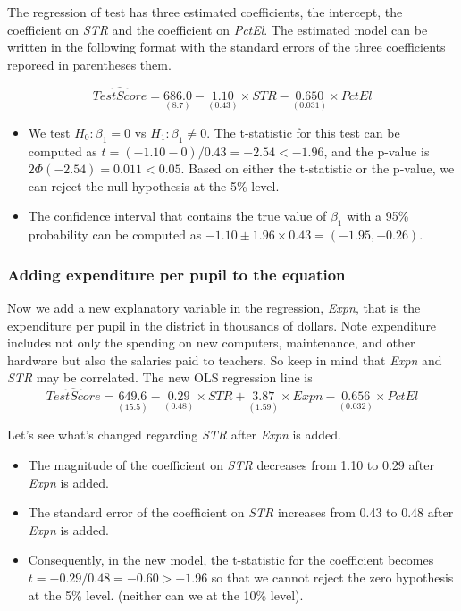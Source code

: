 \documentclass[a4paper,11pt]{article}
\begin{document}
The regression of test has three estimated coefficients, the
intercept, the coefficient on \emph{STR} and the coefficient on
\emph{PctEl}. The estimated model can be written in the following format
with the standard errors of the three coefficients reporeed in
parentheses them.

\begin{equation*}
\widehat{TestScore} = \underset{{\displaystyle (8.7)}}{686.0}
- \underset{{\displaystyle (0.43)}}{1.10} \times STR
- \underset{\displaystyle (0.031)}{0.650} \times PctEl
\end{equation*}

\begin{itemize}
\item We test \(H_0: \beta_1 = 0\) vs \(H_1: \beta_1 \neq 0\). The t-statistic
for this test can be computed as \(t = (-1.10-0) / 0.43 = -2.54 <
  -1.96\), and the p-value is \(2\Phi(-2.54) = 0.011 < 0.05\). Based on
either the t-statistic or the p-value, we can reject the null
hypothesis at the 5\% level.

\item The confidence interval that contains the
true value of \(\beta_1\) with a 95\% probability can be computed as
\(-1.10 \pm 1.96 \times 0.43 = (-1.95, -0.26)\).
\end{itemize}

\subsubsection*{Adding expenditure per pupil to the equation}
\label{sec:orgd309e58}

Now we add a new explanatory variable in the regression, \emph{Expn}, that
is the expenditure per pupil in the district in thousands of dollars.
Note expenditure includes not only the spending on new computers,
maintenance, and other hardware but also the salaries paid to
teachers. So keep in mind that \emph{Expn} and \emph{STR} may be
correlated. The new OLS regression line is
\begin{equation*}
\widehat{TestScore} = \underset{{\displaystyle (15.5)}}{649.6}
- \underset{\displaystyle (0.48)}{0.29} \times STR
+ \underset{\displaystyle (1.59)}{3.87} \times Expn
- \underset{\displaystyle (0.032)}{0.656} \times PctEl
\end{equation*}


Let's see what's changed regarding \emph{STR} after \emph{Expn} is added.
\begin{itemize}
\item The magnitude of the coefficient on \emph{STR} decreases from 1.10 to
0.29 after \emph{Expn} is added.
\item The standard error of the coefficient on \emph{STR} increases from 0.43
to 0.48 after \emph{Expn} is added.
\item Consequently, in the new model, the t-statistic for the coefficient
becomes \(t = -0.29/0.48 = -0.60 > -1.96\) so that we cannot reject
the zero hypothesis at the 5\% level. (neither can we at the 10\%
level).
\end{itemize}
\end{document}
